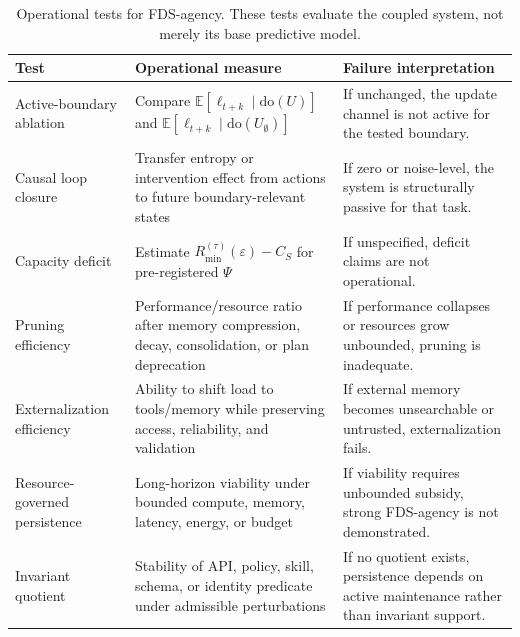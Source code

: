 \documentclass[10pt,a4paper,twocolumn,aps,prl]{revtex4-2}
\newcommand{\E}{\mathbb{E}}
\newcommand{\doop}{\mathrm{do}}
\begin{document}
\begin{table}[ht]
\centering
\caption{Operational tests for FDS-agency. These tests evaluate the coupled system, not merely its base predictive model.}
\label{tab:tests}
\small
\renewcommand{\arraystretch}{1.3}
\begin{tabular}{lll}
\toprule
\textbf{Test} & \parbox[t]{5.8cm}{\raggedright\textbf{Operational measure}} & \parbox[t]{5.8cm}{\raggedright\textbf{Failure interpretation}}\\
\midrule
Active-boundary ablation & \parbox[t]{5.8cm}{\raggedright Compare $\E[\ell_{t+k}\mid \doop(U)]$ and $\E[\ell_{t+k}\mid \doop(U_\emptyset)]$} & \parbox[t]{5.8cm}{\raggedright If unchanged, the update channel is not active for the tested boundary.}\\
Causal loop closure & \parbox[t]{5.8cm}{\raggedright Transfer entropy or intervention effect from actions to future boundary-relevant states} & \parbox[t]{5.8cm}{\raggedright If zero or noise-level, the system is structurally passive for that task.}\\
Capacity deficit & \parbox[t]{5.8cm}{\raggedright Estimate $R_{\min}^{(\tau)}(\varepsilon)-C_S$ for pre-registered $\Psi$} & \parbox[t]{5.8cm}{\raggedright If unspecified, deficit claims are not operational.}\\
Pruning efficiency & \parbox[t]{5.8cm}{\raggedright Performance/resource ratio after memory compression, decay, consolidation, or plan deprecation} & \parbox[t]{5.8cm}{\raggedright If performance collapses or resources grow unbounded, pruning is inadequate.}\\
Externalization efficiency & \parbox[t]{5.8cm}{\raggedright Ability to shift load to tools/memory while preserving access, reliability, and validation} & \parbox[t]{5.8cm}{\raggedright If external memory becomes unsearchable or untrusted, externalization fails.}\\
Resource-governed persistence & \parbox[t]{5.8cm}{\raggedright Long-horizon viability under bounded compute, memory, latency, energy, or budget} & \parbox[t]{5.8cm}{\raggedright If viability requires unbounded subsidy, strong FDS-agency is not demonstrated.}\\
Invariant quotient & \parbox[t]{5.8cm}{\raggedright Stability of API, policy, skill, schema, or identity predicate under admissible perturbations} & \parbox[t]{5.8cm}{\raggedright If no quotient exists, persistence depends on active maintenance rather than invariant support.}\\
\bottomrule
\end{tabular}
\end{table}
\end{document}
